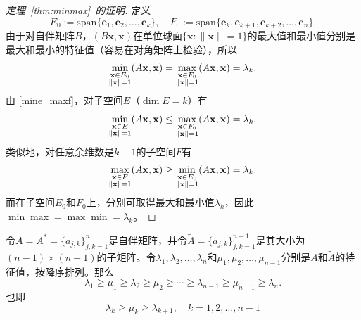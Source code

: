 \begin{proof}[定理~\ref{thm:minmax}~的证明]
  定义
  \[E_0:=\mathrm{span}\{\mathbf{e}_1,\mathbf{e}_2,\ldots,\mathbf{e}_k\},\quad F_0:=\mathrm{span}\{\mathbf{e}_k,\mathbf{e}_{k+1},\mathbf{e}_{k+2},\ldots,\mathbf{e}_n\}.\]
  由于对自伴矩阵$B$，$(B\mathbf{x},\mathbf{x})$在单位球面$\{\mathbf{x}:\|\mathbf{x}\|=1\}$的最大值和最小值分别是最大和最小的特征值（容易在对角矩阵上检验），所以
  \[\min_{\begin{subarray}{c}\mathbf{x}\in E_0\\\|\mathbf{x}\|=1\end{subarray}}(A\mathbf{x},\mathbf{x})=\max_{\begin{subarray}{c}\mathbf{x}\in F_0\\\|\mathbf{x}\|=1\end{subarray}}(A\mathbf{x},\mathbf{x})=\lambda_k.\]
  由 \eqref{mine_maxf}，对子空间$E$（$\dim E=k$）有
  \[\min_{\begin{subarray}{c}\mathbf{x}\in E\\\|\mathbf{x}\|=1\end{subarray}}(A\mathbf{x},\mathbf{x})\leq \max_{\begin{subarray}{c}\mathbf{x}\in F_0\\\|\mathbf{x}\|=1\end{subarray}}(A\mathbf{x},\mathbf{x})=\lambda_k.\]
  类似地，对任意余维数是$k-1$的子空间$F$有
  \[\max_{\begin{subarray}{c}\mathbf{x}\in F\\\|\mathbf{x}\|=1\end{subarray}}(A\mathbf{x},\mathbf{x})\geq \min_{\begin{subarray}{c}\mathbf{x}\in E_0\\\|\mathbf{x}\|=1\end{subarray}}(A\mathbf{x},\mathbf{x})=\lambda_k.\]
  而在子空间$E_0$和$F_0$上，分别可取得最大和最小值$\lambda_k$，因此$\min\max=\max\min=\lambda_k$。
\end{proof}

\begin{corollary}[特征值交错排列]\label{cor:interw}
  令$A=A^*=\{a_{j,k}\}_{j,k=1}^n$是自伴矩阵，并令$\widetilde{A}=\{a_{j,k}\}_{j,k=1}^{n-1}$是其大小为$(n-1)\times (n-1)$的子矩阵。令$\lambda_{1},\lambda_{2},\ldots,\lambda_{n}$和$\mu_{1},\mu_{2},\ldots,\mu_{n-1}$分别是$A$和$\widetilde{A}$的特征值，按降序排列。那么
  \[\lambda_1\geq\mu_1\geq\lambda_2\geq\mu_2\geq\cdots\geq\lambda_{n-1}\geq\mu_{n-1}\geq\lambda_n.\]
  也即
  \[\lambda_k\geq\mu_k\geq\lambda_{k+1},\quad k=1,2,\ldots,n-1\]
\end{corollary}

